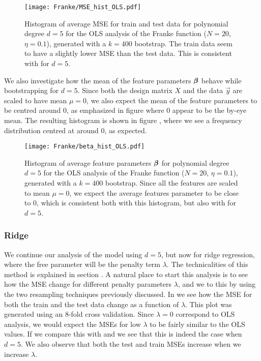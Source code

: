            \begin{figure}
                \texttt{[image: Franke/MSE\_hist\_OLS.pdf]}
                \caption{Histogram of average MSE for train and test data for polynomial degree $d=5$ for the OLS analysis of the Franke function ($N=20$, $\eta=0.1$), generated with a $k=400$ bootstrap. The train data seem to have a slightly lower MSE than the test data. This is consistent with  for $d=5$.}
                \label{fig:mse_hist_ols}
            \end{figure}

            We also investigate how the mean of the feature parameters $\boldsymbol{\beta}$ behave while bootstrapping for $d=5$. Since both the design matrix $X$ and the data $\vec{y}$ are scaled to have mean $\mu=0$, we also expect the mean of the feature parameters to be centred around 0, as emphasized in figure  where 0 appear to be the by-eye mean.  The resulting histogram is shown in figure , where we see a frequency distribution centred at around 0, as expected. 

            \begin{figure}
                \texttt{[image: Franke/beta\_hist\_OLS.pdf]}
                \caption{Histogram of average feature parameters $\boldsymbol{\beta}$ for polynomial degree $d=5$ for the OLS analysis of the Franke function ($N=20$, $\eta=0.1$), generated with a $k=400$ bootstrap. Since all the features are scaled to mean $\mu=0$, we expect the average features parameter to be close to 0, which is consistent both with this histogram, but also with  for $d=5$. }
                \label{fig:beta_hist_ols}
            \end{figure}
            


        

        \subsubsection{Ridge}\label{sec:rigdeanalysis}

        We continue our analysis of the model using $d=5$, but now for ridge regression, where the free parameter will be the penalty term $\lambda$. The technicalities of this method is explained in section . A natural place to start this analysis is to see how the MSE change for different penalty parameters $\lambda$, and we to this by using the two resampling techniques previously discussed. In  we see how the MSE for both the train and the test data change as a function of $\lambda$. This plot was generated using an 8-fold cross validation. Since $\lambda=0$ correspond to OLS analysis, we would expect the MSEs for low $\lambda$ to be fairly similar to the OLS values. If we compare this with  and  we see that this is indeed the case when $d=5$. We also observe that both the test and train MSEs increase when we increase $\lambda$. 

